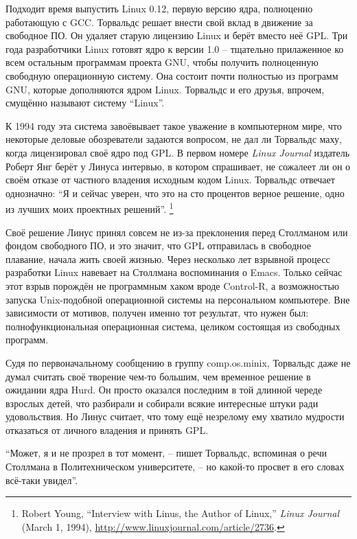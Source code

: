 Подходит время выпустить Linux 0.12, первую версию ядра, полноценно работающую с GCC. Торвальдс решает внести свой вклад в движение за свободное ПО. Он удаляет старую лицензию Linux и берёт вместо неё GPL. Три года разработчики Linux готовят ядро к версии 1.0 -- тщательно прилаженное ко всем остальным программам проекта GNU, чтобы получить полноценную свободную операционную систему. Она состоит почти полностью из программ GNU, которые дополняются ядром Linux. Торвальдс и его друзья, впрочем, смущённо называют систему \enquote{Linux}.

К 1994 году эта система завоёвывает такое уважение в компьютерном мире, что некоторые деловые обозреватели задаются вопросом, не дал ли Торвальдс маху, когда лицензировал своё ядро под GPL. В первом номере \textit{Linux Journal} издатель Роберт Янг берёт у Линуса интервью, в котором спрашивает, не сожалеет ли он о своём отказе от частного владения исходным кодом Linux. Торвальдс отвечает однозначно: \enquote{Я и сейчас уверен, что это на сто процентов верное решение, одно из лучших моих проектных решений}. \footnote{Robert Young, \enquote{Interview with Linus, the Author of Linux,} \textit{Linux Journal} (March 1, 1994), \url{http://www.linuxjournal.com/article/2736}.}

Своё решение Линус принял совсем не из-за преклонения перед Столлманом или фондом свободного ПО, и это значит, что GPL отправилась в свободное плавание, начала жить своей жизнью. Через несколько лет взрывной процесс разработки Linux навевает на Столлмана воспоминания о Emacs. Только сейчас этот взрыв порождён не программным хаком вроде Control-R, а возможностью запуска Unix-подобной операционной системы на персональном компьютере. Вне зависимости от мотивов, получен именно тот результат, что нужен был: полнофункциональная операционная система, целиком состоящая из свободных программ.

Судя по первоначальному сообщению в группу comp.os.minix, Торвальдс даже не думал считать своё творение чем-то большим, чем временное решение в ожидании ядра Hurd. Он просто оказался последним в той длинной череде взрослых детей, что разбирали и собирали всякие интересные штуки ради удовольствия. Но Линус считает, что тому ещё незрелому ему хватило мудрости отказаться от личного владения и принять GPL.

\enquote{Может, я и не прозрел в тот момент, -- пишет Торвальдс, вспоминая о речи Столлмана в Политехническом университете, -- но какой-то просвет в его словах всё-таки увидел}.
